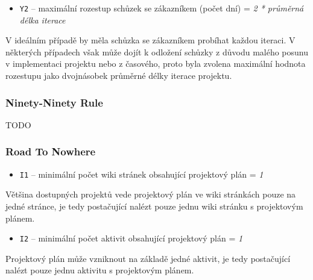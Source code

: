 \documentclass[czech,DP]{thesiskiv}
\begin{document}
\begin{itemize}
    \item \texttt{Y2} -- maximální rozestup schůzek se zákazníkem (počet dní) = \textit{2 * průměrná délka iterace}
\end{itemize}
V ideálním případě by měla schůzka se zákazníkem probíhat každou iteraci. V některých případech však může dojít k odložení schůzky z důvodu malého posunu v implementaci projektu nebo z časového, proto byla zvolena maximální hodnota rozestupu jako dvojnásobek průměrné délky iterace projektu.
\subsubsection{Ninety-Ninety Rule}
TODO
\subsubsection{Road To Nowhere}
\begin{itemize}
    \item \texttt{I1} -- minimální počet wiki stránek obsahující projektový plán = \textit{1}
\end{itemize}
Většina dostupných projektů vede projektový plán ve wiki stránkách pouze na jedné stránce, je tedy postačující nalézt pouze jednu wiki stránku s projektovým plánem.
\begin{itemize}
    \item \texttt{I2} -- minimální počet aktivit obsahující projektový plán = \textit{1}
\end{itemize}
Projektový plán může vzniknout na základě jedné aktivit, je tedy postačující nalézt pouze jednu aktivitu s projektovým plánem.
\end{document}
